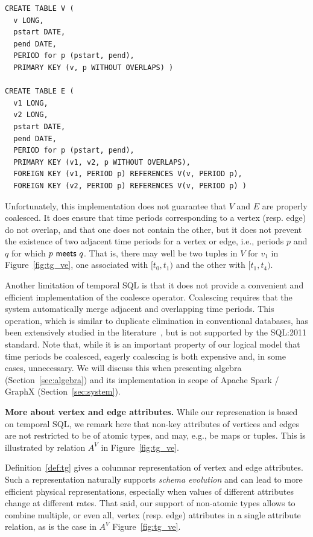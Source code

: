 \begin{small}
\begin{verbatim}
CREATE TABLE V (
  v LONG,
  pstart DATE,
  pend DATE,
  PERIOD for p (pstart, pend),
  PRIMARY KEY (v, p WITHOUT OVERLAPS) )

CREATE TABLE E (
  v1 LONG,
  v2 LONG,
  pstart DATE,
  pend DATE,
  PERIOD for p (pstart, pend),
  PRIMARY KEY (v1, v2, p WITHOUT OVERLAPS),
  FOREIGN KEY (v1, PERIOD p) REFERENCES V(v, PERIOD p),
  FOREIGN KEY (v2, PERIOD p) REFERENCES V(v, PERIOD p) )
\end{verbatim}
\end{small}

Unfortunately, this implementation does not guarantee that $V$ and $E$
are properly coalesced.  It does ensure that time periods
corresponding to a vertex (resp. edge) do not overlap, and that one
does not contain the other, but it does not prevent the existence of
two adjacent time periods for a vertex or edge, i.e., periods $p$ and
$q$ for which $p~\mathsf{meets}~q$.  That is, there may well be two
tuples in $V$ for $v_1$ in Figure~\ref{fig:tg_ve}, one associated with
$[t_0,t_1)$ and the other with $[t_1,t_4)$.

Another limitation of temporal SQL is that it does not provide a
convenient and efficient implementation of the coalesce operator.
Coalescing requires that the system automatically merge adjacent and
overlapping time periods.  This operation, which is similar to
duplicate elimination in conventional databases, has been extensively
studied in the
literature~\cite{DBLP:conf/vldb/BohlenSS96,DBLP:journals/sigmod/Zimanyi06},
but is not supported by the SQL:2011 standard.  Note that, while it is
an important property of our logical model that time periods be
coalesced, eagerly coalescing is both expensive and, in some cases,
unnecessary.  We will discuss this when presenting \tg algebra
(Section~\ref{sec:algebra}) and its implementation in scope of Apache
Spark / GraphX (Section~\ref{sec:system}).

{\bf More about vertex and edge attributes.} While our \ve
represenation is based on temporal SQL, we remark here that non-key
attributes of vertices and edges are not restricted to be of atomic
types, and may, e.g., be maps or tuples. This is illustrated by
relation $A^V$ in Figure~\ref{fig:tg_ve}.

Definition~\ref{def:tg} gives a columnar representation of vertex and
edge attributes.  Such a representation naturally supports {\em schema
  evolution} and can lead to more efficient physical representations,
especially when values of different attributes change at different
rates.  That said, our support of non-atomic types allows to combine
multiple, or even all, vertex (resp. edge) attributes in a single
attribute relation, as is the case in $A^V$ Figure~\ref{fig:tg_ve}.

